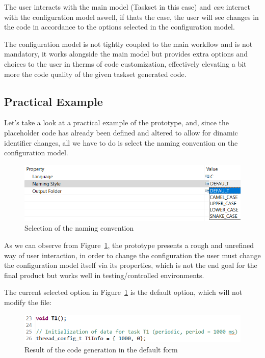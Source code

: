 The user interacts with the main model (Taskset in this case) and \textit{can} interact with the configuration model aswell, if thats the case, the user will see changes in the code in accordance to the options selected in the configuration model.

The configuration model is not tightly coupled to the main workflow and is not mandatory, it works alongside the main model but provides extra options and choices to the user in therms of code customization, effectively elevating a bit more the code quality of the given taskset generated code.

\subsection{Practical Example}
\label{sec:practical_example}
 
Let's take a look at a practical example of the prototype, and, since the placeholder code has already been defined and altered to allow for dinamic identifier changes, all we have to do is select the naming convention on the configuration model.

\begin{figure}[htbp]
	\centering
	\includegraphics[height=0.22\textwidth]{naming_convention_selection.png}
	\caption{Selection of the naming convention}
	\label{fig:prototype_selection}
\end{figure}

As we can observe from Figure~\ref{fig:prototype_selection}, the prototype presents a rough and unrefined way of user interaction, in order to change the configuration the user must change the configuration model itself via its properties, which is not the end goal for the final product but works well in testing/controlled environments. 

The current selected option in Figure~\ref{fig:prototype_selection} is the default option, which will not modify the file:

\begin{figure}[htbp]
	\centering
	\includegraphics[height=0.12\textwidth]{default_naming_option.png}
	\caption{Result of the code generation in the default form}
	\label{fig:prototype_default_option}
\end{figure}

